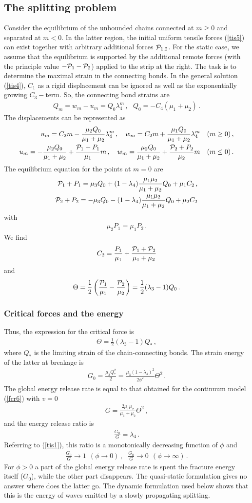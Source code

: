 \documentclass[12pt]{article}
\newcommand{\f}{\frac}
\newcommand{\n}{\nonumber \\}
\newcommand{\beq}{\begin{eqnarray}}
\newcommand{\eeq}[1]{\label{#1}\end{eqnarray}}
\newcommand\eq[1]{(\ref{#1})}
\newcommand\gl{\left}
\newcommand\gr{\right}
\newcommand{\CP}{{\cal P}}
\newcommand{\Gf}{\phi}
\newcommand{\Gl}{\lambda}
\newcommand{\Gm}{\mu}
\newcommand{\GT}{\Theta}
\begin{document}
\subsection{The splitting problem}
Consider the equilibrium of the unbounded chains connected at $m\ge 0$ and separated at $m<0$. In the latter region, the initial uniform tensile forces \eq{tis5} can exist together with arbitrary additional forces $\CP_{1,2}$. For the static case, we assume that the equilibrium is supported by the additional remote forces (with the principle value $-\CP_1-\CP_2$) applied to the strip at the right. The task is to determine the maximal strain in the connecting bonds. In the general solution \eq{tis4}, $C_1$ as a rigid displacement can be ignored as well as the exponentially growing $C_3-$term. So, the connecting bond strains are
\beq Q_m= w_m-u_m = Q_0\Gl_4^m\,,~~~Q_0= - C_4(\Gm_1+\Gm_2)\,.\eeq{tis57}
The displacements can be represented as
\beq  u_m = C_2m - \f{\Gm_2 Q_0}{\Gm_1+\Gm_2}\Gl_4^m\,,~~~w_m = C_2m +\f{\Gm_1 Q_0}{\Gm_1+\Gm_2}\Gl_4^m~~~(m\ge 0)\,,\n
u_m = - \f{\Gm_2 Q_0}{\Gm_1+\Gm_2} +\f{\CP_1+P_1}{\Gm_1}m\,,~~~w_m = \f{\Gm_2 Q_0}{\Gm_1+\Gm_2} +\f{\CP_2+P_2}{\Gm_2}m~~~(m\le 0)\,.\eeq{tis58}
The equilibrium equation for the points at $m=0$ are
\beq \CP_1+P_1=\Gm_3 Q_0 +(1-\Gl_4)\f{\Gm_1\Gm_2}{\Gm_1+\Gm_2}Q_0+\Gm_1C_2\,,\n
\CP_2+P_2=-\Gm_3 Q_0 -(1-\Gl_4)\f{\Gm_1\Gm_2}{\Gm_1+\Gm_2}Q_0+\Gm_2C_2\eeq{tis60}
with
\beq \Gm_2P_1=\Gm_1P_2\,.\eeq{tis600}
We find
\beq C_2=\f{P_1}{\Gm_1}+\f{\CP_1+\CP_2}{\Gm_1+\Gm_2}\eeq{tis601}
and
\beq \GT =\f{1}{2}\gl( \f{\CP_1}{\Gm_1}-\f{\CP_2}{\Gm_2}\gr) = \f{1}{2}(\Gl_3-1)Q_0\,.\eeq{tis602}

\subsubsection{Critical forces and the energy}
Thus, the expression for the critical force is
\beq \GT =\f{1}{2}(\Gl_3-1)Q_*\,,\eeq{tis62}
where $Q_*$ is the limiting strain of the chain-connecting bonds. The strain energy of the latter at breakage is
\beq G_0 = \f{\Gm_3 Q_*^2}{2}=\f{\Gm_3(1-\Gl_4)^2}{2\Gf^2}\GT^2\,.\eeq{qs5}
The global energy release rate is equal to that obtained for the continuum model \eq{fcr6} with $v=0$
\beq G = \f{2\Gm_1\Gm_2}{\Gm_1+\Gm_2}\GT^2\,,\eeq{qs6}
and the energy release ratio is
\beq \f{G_0}{G}=\Gl_4\,.\eeq{qsa6}
Referring to \eq{tis1}, this ratio is a monotonically decreasing function of $\Gf$ and
\beq \f{G_0}{G}  \to 1 ~~(\Gf\to 0)\,,~~~ \f{G_0}{G} \to 0~~(\Gf\to\infty)\,.\eeq{err1}
For $\Gf>0$ a part of the global energy release rate is spent the fracture energy itself ($G_0$), while the other part disappears. The quasi-static formulation gives no answer where does the latter go. The dynamic formulation used below shows that this is the energy of waves emitted by a slowly propagating splitting.
\end{document}
